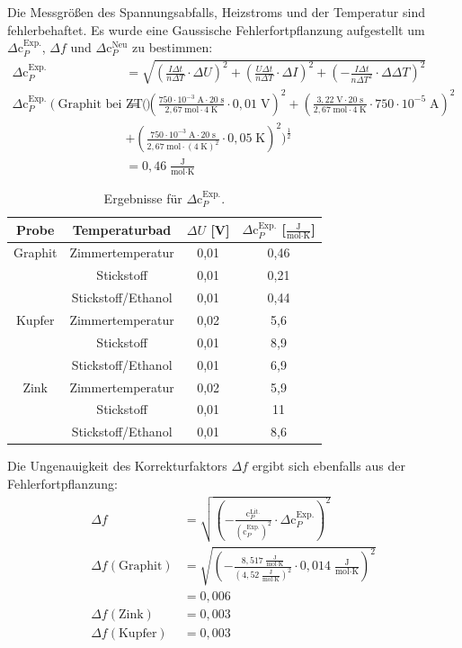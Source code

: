 \documentclass[12pt,a4paper,titlepage,headinclude,bibtotoc]{scrartcl}
\begin{document}
Die Messgrößen des Spannungsabfalls, Heizstroms und der Temperatur sind fehlerbehaftet. Es wurde eine Gaussische Fehlerfortpflanzung aufgestellt um $\Delta\text{c}_P^{\text{Exp.}}$, $\Delta f$ und $\Delta\text{c}_P^{\text{Neu}}$ zu bestimmen:
\begin{align}
\Delta \text{c}_P^{\text{Exp.}}&=\sqrt{ \left(\frac{I\Delta t}{n\Delta T}\cdot \Delta U \right)^2+\left(\frac{U\Delta t}{n\Delta T}\cdot \Delta I \right)^2+\left(- \frac{I\Delta t}{n\Delta T^2}\cdot \Delta\Delta T\right)^2}\\
\Delta \text{c}_P^{\text{Exp.}}(\text{Graphit bei ZT})&=\Biggl( \left(\frac{750\cdot 10^{-3}\;\text{A} \cdot 20\;\text{s}}{2,67\;\text{mol}\cdot 4\;\text{K}}\cdot 0,01\;\text{V} \right)^2+\left(\frac{3,22\;\text{V} \cdot 20\;\text{s}}{2,67\;\text{mol}\cdot 4\;\text{K}}\cdot750\cdot 10^{-5}\;\text{A} \right)^2\\
& +\left(\frac{750\cdot 10^{-3}\;\text{A} \cdot 20\;\text{s}}{2,67\;\text{mol}\cdot (4\;\text{K})^2}\cdot 0,05\;\text{K} \right)^2\Biggr)^{\frac{1}{2}}\\
&=0,46 \;\frac{\text{J}}{\text{mol}\cdot\text{K}}
\end{align}
\begin{table}[h!]
\centering
\caption{Ergebnisse für $\Delta \text{c}_P^{\text{Exp.}}$.}
\begin{tabular}{c|c|c|c}
Probe&Temperaturbad&$\Delta U$ [V]&$\Delta \text{c}_P^{\text{Exp.}}$ [$\frac{\text{J}}{\text{mol}\cdot\text{K}}$]\\
\hline
Graphit& Zimmertemperatur&0,01&0,46\\
\hline
&Stickstoff&0,01&0,21\\
\hline
&Stickstoff/Ethanol&0,01&0,44\\
\hline
Kupfer&Zimmertemperatur&0,02& 5,6\\
\hline
&Stickstoff&0,01&8,9\\
\hline
&Stickstoff/Ethanol&0,01&6,9\\
\hline
Zink &Zimmertemperatur&0,02& 5,9\\
\hline
&Stickstoff&0,01&11\\
\hline
&Stickstoff/Ethanol&0,01&8,6\\
\end{tabular}
\end{table}
\FloatBarrier
Die Ungenauigkeit des Korrekturfaktors $\Delta f$ ergibt sich ebenfalls aus der Fehlerfortpflanzung:
\begin{align}
\Delta f &= \sqrt{ \left(-\frac{\text{c}_P^{\text{Lit.}}}{(\text{c}_P^{\text{Exp.}})^2}\cdot \Delta \text{c}_P^{\text{Exp.}} \right)^2}\\
\Delta f (\text{Graphit})&= \sqrt{ \left(-\frac{8,517\;\frac{\text{J}}{\text{mol}\cdot\text{K}}}{(4,52\;\frac{\text{J}}{\text{mol}\cdot\text{K}})^2}\cdot 0,014\;\frac{\text{J}}{\text{mol}\cdot\text{K}}\right)^2}\\
&= 0,006\\
\Delta f (\text{Zink})&=0,003\\ 
\Delta f (\text{Kupfer})&=0,003\\
\end{align} 
\end{document}
